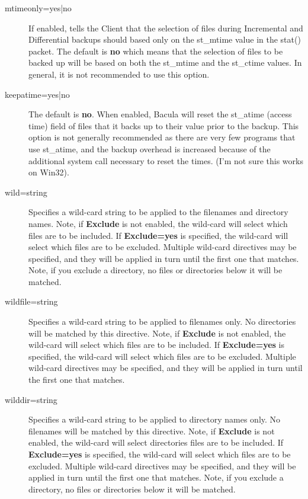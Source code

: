 \begin{description}
\item [mtimeonly=yes|no]
   If enabled, tells the Client that the selection of files during
   Incremental and Differential backups should based only on the st\_mtime
   value in the stat() packet.  The default is {\bf no} which means that
   the selection of files to be backed up will be based on both the
   st\_mtime and the st\_ctime values.  In general, it is not recommended
   to use this option.

\item [keepatime=yes|no]
   The default is {\bf no}.  When enabled, Bacula will reset the st\_atime
   (access time) field of files that it backs up to their value prior to
   the backup.  This option is not generally recommended as there are very
   few programs that use st\_atime, and the backup overhead is increased
   because of the additional system call necessary to reset the times.
   (I'm not sure this works on Win32).

\item [wild=\lt{}string\gt{}]
   Specifies a wild-card string to be applied to the filenames and
   directory names.  Note, if {\bf Exclude} is not enabled, the wild-card
   will select which files are to be included.  If {\bf Exclude=yes} is
   specified, the wild-card will select which files are to be excluded.
   Multiple wild-card directives may be specified, and they will be applied
   in turn until the first one that matches.  Note, if you exclude a
   directory, no files or directories below it will be matched.

\item [wildfile=\lt{}string\gt{}]
   Specifies a wild-card string to be applied to filenames only.  No
   directories will be matched by this directive.  Note, if {\bf Exclude}
   is not enabled, the wild-card will select which files are to be
   included.  If {\bf Exclude=yes} is specified, the wild-card will select
   which files are to be excluded.  Multiple wild-card directives may be
   specified, and they will be applied in turn until the first one that
   matches.

\item [wilddir=\lt{}string\gt{}]
   Specifies a wild-card string to be applied to directory names only.  No
   filenames will be matched by this directive.  Note, if {\bf Exclude} is
   not enabled, the wild-card will select directories files are to be
   included.  If {\bf Exclude=yes} is specified, the wild-card will select
   which files are to be excluded.  Multiple wild-card directives may be
   specified, and they will be applied in turn until the first one that
   matches.  Note, if you exclude a directory, no files or directories
   below it will be matched.



\end{description}
